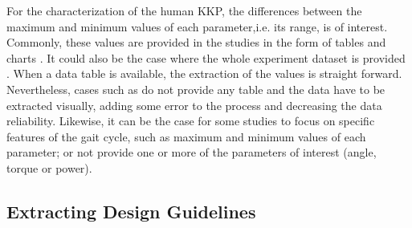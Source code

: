 For the characterization of the human KKP, the differences between the maximum and minimum values of each parameter,i.e. its range, is of interest. Commonly, these values are provided in the studies in the form of tables and charts \cite{han2011biomechanical,yali2010biomechanics}. It could also be the case where the whole experiment dataset is provided \cite{moore2015elaborate}. When a data table is available, the extraction of the values is straight forward. Nevertheless, cases such as \cite{protopapadaki2007hip,riener2002stair,mcintosh2006gait,roebroeck1994biomechanics,mak2003joint} do not provide any table and the data have to be extracted visually, adding some error to the process and decreasing the data reliability. Likewise, it can be the case for some studies to focus on specific features of the gait cycle, such as maximum and minimum values of each parameter; or not provide one or more of the parameters of interest (angle, torque or power).

\subsection{Extracting Design Guidelines}

